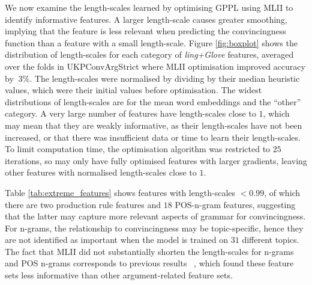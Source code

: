 We now examine the length-scales learned by optimising GPPL using MLII  
to identify informative features. 
A larger length-scale causes greater smoothing, 
implying that the feature is less relevant when predicting the convincingness function
than a feature with a small length-scale. 
Figure \ref{fig:boxplot} shows the distribution of length-scales for each category of
\emph{ling+Glove} features, averaged over the folds in UKPConvArgStrict where MLII
optimisation improved accuracy by $\>3\%$. The length-scales
were normalised by dividing by their median heuristic values, 
which were their initial values before optimisation.
The widest distributions of length-scales are for the mean word embeddings and the ``other'' category.
A very large number of features have length-scales close to $1$,
which may mean that they are weakly informative, as their length-scales have not been increased,
or that there was insufficient data or time to learn their length-scales.
To limit computation time, the optimisation algorithm was restricted to $25$ iterations, 
so may only have fully optimised features with larger gradients, 
leaving other features with normalised length-scales close to $1$.
 
Table \ref{tab:extreme_features} shows features with length-scales $<0.99$,
of which there are two production rule features and $18$ POS-n-gram features,
suggesting that the latter may capture more relevant aspects of grammar for convincingness. 
For n-grams, the relationship to convincingness may be topic-specific, 
hence they are not identified as important when the model is trained on $31$ different topics. 
The fact that MLII did not substantially shorten the length-scales for n-grams and POS n-grams 
corresponds to previous results ~\cite{persing2017can}, which found these feature sets less informative than other argument-related feature sets.
 
